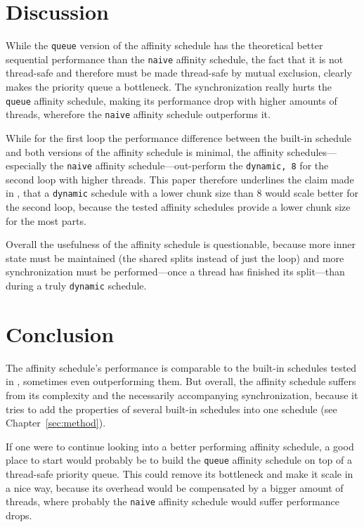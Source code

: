\documentclass[twoside,11pt]{article}
\begin{document}

\section{Discussion} %

While the \texttt{queue} version of the affinity schedule
has the theoretical better sequential performance than the
\texttt{naive} affinity schedule, the fact that it is not
thread-safe and therefore must be made thread-safe by
mutual exclusion, clearly makes the priority queue a
bottleneck.
The synchronization really hurts the \texttt{queue}
affinity schedule, making its performance drop with higher
amounts of threads, wherefore the \texttt{naive} affinity
schedule outperforms it.

While for the first loop the performance difference between
the built-in schedule and both versions of the affinity
schedule is minimal, the affinity schedules---especially
the \texttt{naive} affinity schedule---out-perform the
\texttt{dynamic, 8} for the second loop with higher
threads.
This paper therefore underlines the claim made in
\citep{b1}, that a \texttt{dynamic} schedule with a lower
chunk size than 8 would scale better for the second loop,
because the tested affinity schedules provide a lower
chunk size for the most parts.

Overall the usefulness of the affinity schedule is
questionable, because more inner state must be maintained
(the shared splits instead of just the loop) and more
synchronization must be performed---once a thread has
finished its split---than during a truly \texttt{dynamic}
schedule.


\section{Conclusion} %

The affinity schedule's performance is comparable to the
built-in schedules tested in \citet{b1}, sometimes even
outperforming them.
But overall, the affinity schedule suffers from its
complexity and the necessarily accompanying
synchronization, because it tries to add the properties
of several built-in schedules into one schedule (see
Chapter~\ref{sec:method}).

If one were to continue looking into a better performing
affinity schedule, a good place to start would probably be
to build the \texttt{queue} affinity schedule on top of a
thread-safe priority queue.
This could remove its bottleneck and make it scale in a
nice way, because its overhead would be compensated by
a bigger amount of threads, where probably the
\texttt{naive} affinity schedule would suffer performance
drops.
%



\end{document}
